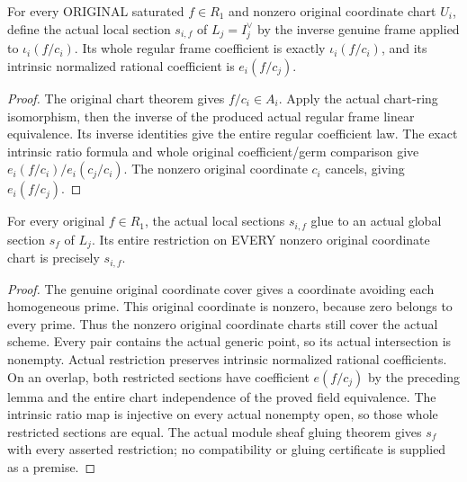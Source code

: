 \begin{definition}
\label{def:seven-native-original-local-section}
\leanok
For every ORIGINAL saturated $f\in R_1$ and nonzero original coordinate
chart $U_i$, define the actual local section $s_{i,f}$ of $L_j=I_j^\vee$
by the inverse genuine frame applied to $\iota_i(f/c_i)$. Its whole
regular frame coefficient is exactly $\iota_i(f/c_i)$, and its intrinsic
normalized rational coefficient is $e_i(f/c_j)$.
\end{definition}
\begin{proof}
The original chart theorem gives $f/c_i\in A_i$. Apply the actual chart-ring
isomorphism, then the inverse of the produced actual regular frame linear
equivalence. Its inverse identities give the entire regular coefficient
law. The exact intrinsic ratio formula and whole original coefficient/germ
comparison give $e_i(f/c_i)/e_i(c_j/c_i)$. The nonzero original coordinate
$c_i$ cancels, giving $e_i(f/c_j)$.
\end{proof}

\begin{theorem}
\label{thm:seven-native-original-global-section-gluing}
\leanok
For every original $f\in R_1$, the actual local sections $s_{i,f}$ glue to
an actual global section $s_f$ of $L_j$. Its entire restriction on EVERY
nonzero original coordinate chart is precisely $s_{i,f}$.
\end{theorem}
\begin{proof}
The genuine original coordinate cover gives a coordinate avoiding each
homogeneous prime. This original coordinate is nonzero, because zero
belongs to every prime. Thus the nonzero original coordinate charts still
cover the actual scheme. Every pair contains the actual generic point,
so its actual intersection is nonempty. Actual restriction preserves
intrinsic normalized rational coefficients. On an overlap, both restricted
sections have coefficient $e(f/c_j)$ by the preceding lemma and the entire
chart independence of the proved field equivalence. The intrinsic ratio
map is injective on every actual nonempty open, so those whole restricted
sections are equal. The actual module sheaf gluing theorem gives $s_f$
with every asserted restriction; no compatibility or gluing certificate
is supplied as a premise.
\end{proof}

